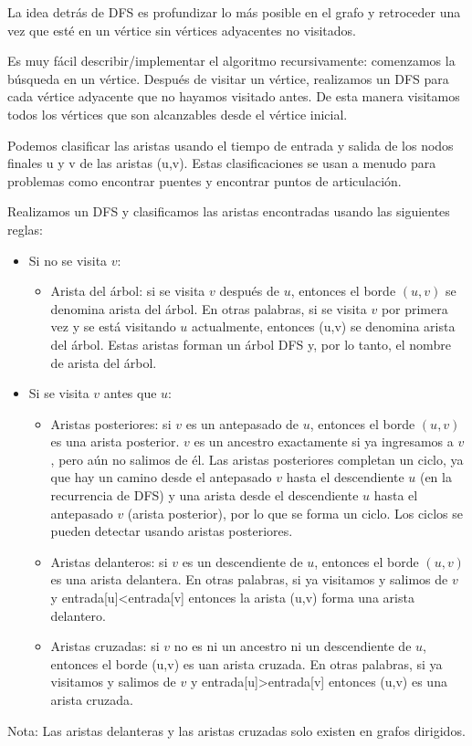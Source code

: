 La idea detrás de DFS es profundizar lo más posible en el grafo y retroceder una vez que esté en un vértice sin vértices adyacentes no visitados.

Es muy fácil describir/implementar el algoritmo recursivamente: comenzamos la búsqueda en un vértice. Después de visitar un vértice, realizamos un DFS para cada vértice adyacente que no hayamos visitado antes. De esta manera visitamos todos los vértices que son alcanzables desde el vértice inicial.

Podemos clasificar las aristas usando el tiempo de entrada y salida de los nodos finales u y v de las aristas (u,v). Estas clasificaciones se usan a menudo para problemas como encontrar puentes y encontrar puntos de articulación.

Realizamos un DFS y clasificamos las aristas encontradas usando las siguientes reglas:

\begin{itemize}
	\item Si no se visita $v$: 
	\begin{itemize}
		\item Arista del árbol: si se visita $v$ después de $u$, entonces el borde $(u, v)$ se denomina arista del árbol. En otras palabras, si se visita $v$ por primera vez y se está visitando $u$ actualmente, entonces (u,v) se denomina arista del árbol. Estas aristas forman un árbol DFS y, por lo tanto, el nombre de arista del árbol.
		
	\end{itemize}
	\item Si se visita $v$ antes que $u$:
	\begin{itemize}
		\item Aristas posteriores: si $v$ es un antepasado de $u$, entonces el borde $(u, v)$ es una arista posterior. $v$ es un ancestro exactamente si ya ingresamos a $v$, pero aún no salimos de él. Las aristas posteriores completan un ciclo, ya que hay un camino desde el antepasado $v$ hasta el descendiente $u$ (en la recurrencia de DFS) y una arista desde el descendiente $u$ hasta el antepasado $v$ (arista posterior), por lo que se forma un ciclo. Los ciclos se pueden detectar usando aristas posteriores.
		
		\item Aristas delanteros: si $v$ es un descendiente de $u$, entonces el borde $(u,v)$ es una arista delantera. En otras palabras, si ya visitamos y salimos de $v$ y entrada[u]<entrada[v] entonces la arista (u,v) forma una arista delantero.
		
		\item Aristas cruzadas: si $v$ no es ni un ancestro ni un descendiente de $u$, entonces el borde (u,v) es uan arista cruzada. En otras palabras, si ya visitamos y salimos de $v$ y entrada[u]>entrada[v] entonces (u,v) es una arista cruzada.
	\end{itemize}
\end{itemize}

Nota: Las aristas delanteras y las aristas cruzadas solo existen en grafos dirigidos.